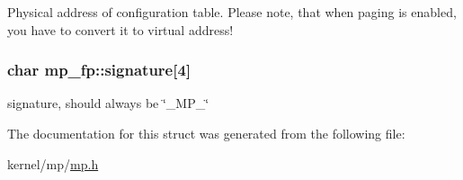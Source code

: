 \label{structmp__fp_ab714f4a6339f0a7bb19fec19c4e06877}
Physical address of configuration table. Please note, that when paging is enabled, you have to convert it to virtual address! \hypertarget{structmp__fp_ae6aa326faac247e8cfca9e23b575d7e0}{
\subsubsection[{signature}]{\setlength{\rightskip}{0pt plus 5cm}char {\bf mp\_\-fp::signature}\mbox{[}4\mbox{]}}}
\label{structmp__fp_ae6aa326faac247e8cfca9e23b575d7e0}
signature, should always be \char`\"{}\_\-MP\_\-\char`\"{} 

The documentation for this struct was generated from the following file:\begin{DoxyCompactItemize}
\item 
kernel/mp/\hyperlink{mp_8h}{mp.h}\end{DoxyCompactItemize}
